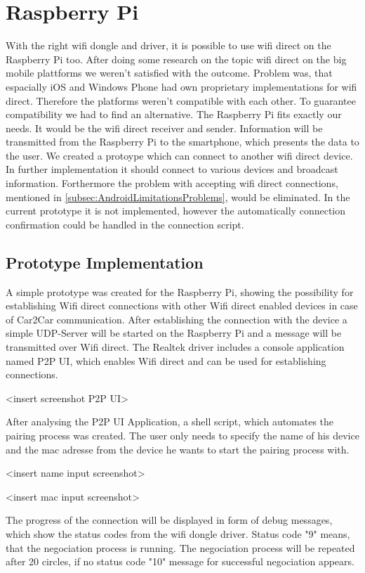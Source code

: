 \section{Raspberry Pi}
\label{sec:RaspberryPi}
With the right wifi dongle and driver, it is possible to use wifi direct on the Raspberry Pi too. After doing some research on the topic wifi direct on the big mobile plattforms we weren't satisfied with the outcome. Problem was, that espacially iOS and Windows Phone had own proprietary implementations for wifi direct. Therefore the platforms weren't compatible with each other. To guarantee compatibility we had to find an alternative. The Raspberry Pi fits exactly our needs. It would be the wifi direct receiver and sender. Information will be transmitted from the Raspberry Pi to the smartphone, which presents the data to the user. We created a protoype which can connect to another wifi direct device. In further implementation it should connect to various devices and broadcast information. Forthermore the problem with accepting wifi direct connections, mentioned in \ref{subsec:AndroidLimitationsProblems}, would be eliminated. In the current prototype it is not implemented, however the automatically connection confirmation could be handled in the connection script.

\subsection*{Prototype Implementation}
\label{subsec:RaspberryPrototype}
A simple prototype was created for the Raspberry Pi, showing the possibility for establishing Wifi direct connections with other Wifi direct enabled devices in case of Car2Car communication. After establishing the connection with the device a simple UDP-Server will be started on the Raspberry Pi and a message will be transmitted over Wifi direct. The Realtek driver includes a console application named P2P UI, which enables Wifi direct and can be used for establishing connections. 

<insert screenshot P2P UI>

After analysing the P2P UI Application, a shell script, which automates the pairing process was created. The user only needs to specify the name of his device and the mac adresse from the device he wants to start the pairing process with. 

<insert name input screenshot>

<insert mac input screenshot>

The progress of the connection will be displayed in form of debug messages, which show the status codes from the wifi dongle driver. Status code "9" means, that the negociation process is running. The negociation process will be repeated after 20 circles, if no status code "10" message for successful negociation appears. 

